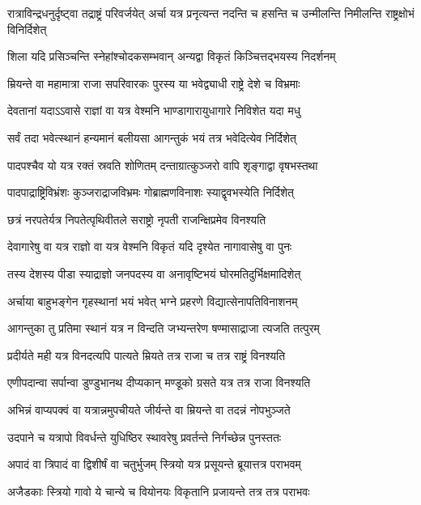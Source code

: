 रात्राविन्द्रधनुर्दृष्ट्वा तद्राष्ट्रं परिवर्जयेत्
\twolineshloka
{अर्चा यत्र प्रनृत्यन्त नदन्ति च हसन्ति च}
{उन्मीलन्ति निमीलन्ति राष्ट्रक्षोभं विनिर्दिशेत्}


\twolineshloka
{शिला यदि प्रसिञ्चन्ति स्नेहांश्चोदकसम्भवान्}
{अन्यद्वा विकृतं किञ्चित्तद्भयस्य निदर्शनम्}


\twolineshloka
{म्रियन्ते वा महामात्रा राजा सपरिवारकः}
{पुरस्य या भवेद्व्याधी राष्ट्रे देशे च विभ्रमाः}


\twolineshloka
{देवतानां यदाऽऽवासे राज्ञां वा यत्र वेश्मनि}
{भाण्डागारायुधागारे निविशेत यदा मधु}


\twolineshloka
{सर्वं तदा भवेत्स्थानं हन्यमानं बलीयसा}
{आगन्तुकं भयं तत्र भवेदित्येव निर्दिशेत्}


\twolineshloka
{पादपश्चैव यो यत्र रक्तं स्रवति शोणितम्}
{दन्ताग्रात्कुञ्जरो वापि शृङ्गाद्वा वृषभस्तथा}


\twolineshloka
{पादपाद्राष्ट्रिविभ्रंशः कुञ्जराद्राजविभ्रमः}
{गोब्राह्मणविनाशः स्याद्वृवभस्येति निर्दिशेत्}


\twolineshloka
{छत्रं नरपतेर्यत्र निपतेत्पृथिवीतले}
{सराष्ट्रो नृपती राजन्क्षिप्रमेव विनश्यति}


\twolineshloka
{देवागारेषु वा यत्र राज्ञो वा यत्र वेश्मनि}
{विकृतं यदि दृश्येत नागावासेषु वा पुनः}


\twolineshloka
{तस्य देशस्य पीडा स्याद्राज्ञो जनपदस्य वा}
{अनावृष्टिभयं घोरमतिदुर्भिक्षमादिशेत्}


\twolineshloka
{अर्चाया बाहुभङ्गेन गृहस्थानां भयं भवेत्}
{भग्ने प्रहरणे विद्यात्सेनापतिविनाशनम्}


\twolineshloka
{आगन्तुका तु प्रतिमा स्थानं यत्र न विन्दति}
{जभ्यन्तरेण षण्मासाद्राजा त्यजति तत्पुरम्}


\twolineshloka
{प्रदीर्यते मही यत्र विनदत्यपि पात्यते}
{म्रियते तत्र राजा च तत्र राष्ट्रं विनश्यति}


\twolineshloka
{एणीपदान्वा सर्पान्वा डुण्डुभानथ दीप्यकान्}
{मण्डूको ग्रसते यत्र तत्र राजा विनश्यति}


\twolineshloka
{अभिन्नं वाप्यपक्वं वा यत्रान्नमुपचीयते}
{जीर्यन्ते वा म्रियन्ते वा तदन्नं नोपभुञ्जते}


\twolineshloka
{उदपाने च यत्रापो विवर्धन्ते युधिष्ठिर}
{स्थावरेषु प्रवर्तन्ते निर्गच्छेन्न पुनस्ततः}


\twolineshloka
{अपादं वा त्रिपादं वा द्विशीर्षं वा चतुर्भुजम्}
{स्त्रियो यत्र प्रसूयन्ते ब्रूयात्तत्र पराभवम्}


\twolineshloka
{अजैडकाः स्त्रियो गावो ये चान्ये च वियोनयः}
{विकृतानि प्रजायन्ते तत्र तत्र पराभवः}



